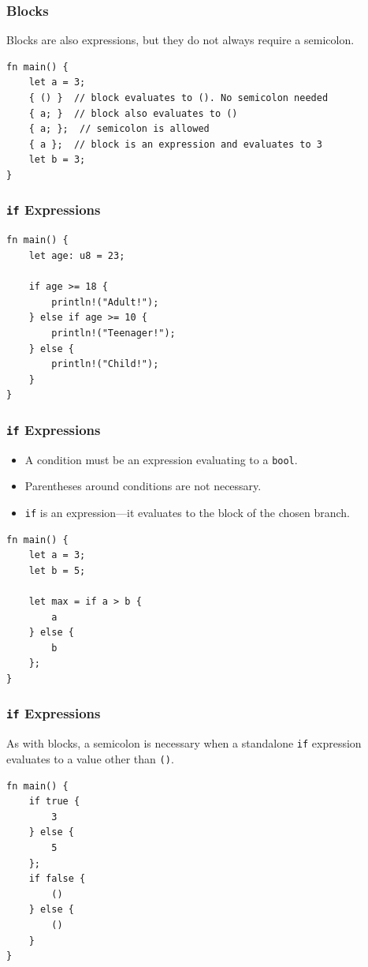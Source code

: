 \begin{frame}[fragile]
    \frametitle{Blocks}
    Blocks are also expressions, but they do not always require a semicolon.
    \pause
    \vfill
    \begin{verbatim}
fn main() {
    let a = 3;
    { () }  // block evaluates to (). No semicolon needed
    { a; }  // block also evaluates to ()
    { a; };  // semicolon is allowed
    { a };  // block is an expression and evaluates to 3 
    let b = 3;
}
    \end{verbatim}
\end{frame}

\begin{frame}[fragile]
    \frametitle{\texttt{if} Expressions}
    \begin{verbatim}
fn main() {
    let age: u8 = 23;

    if age >= 18 {
        println!("Adult!");
    } else if age >= 10 {
        println!("Teenager!");
    } else {
        println!("Child!");
    }
}
    \end{verbatim}
\end{frame}

\begin{frame}[fragile]
    \frametitle{\texttt{if} Expressions}
    \begin{itemize}
        \item A condition must be an expression evaluating to a \texttt{bool}.
        \item Parentheses around conditions are not necessary.
        \pause
        \vfill
        \vspace{.5cm}
        \item \texttt{if} is an expression---it evaluates to the block of the chosen branch.
    \end{itemize}
    \pause
    \vfill
    \begin{verbatim}
fn main() {
    let a = 3;
    let b = 5;
    
    let max = if a > b {
        a
    } else {
        b
    };
}
    \end{verbatim}
\end{frame}

\begin{frame}[fragile]
    \frametitle{\texttt{if} Expressions}
    As with blocks, a semicolon is necessary when a standalone \texttt{if} expression evaluates to a value other than \texttt{()}.
    \pause
    \vfill
    \begin{verbatim}
fn main() {
    if true {
        3
    } else {
        5
    };
    if false {
        ()
    } else {
        ()
    }
}
    \end{verbatim}
\end{frame}

